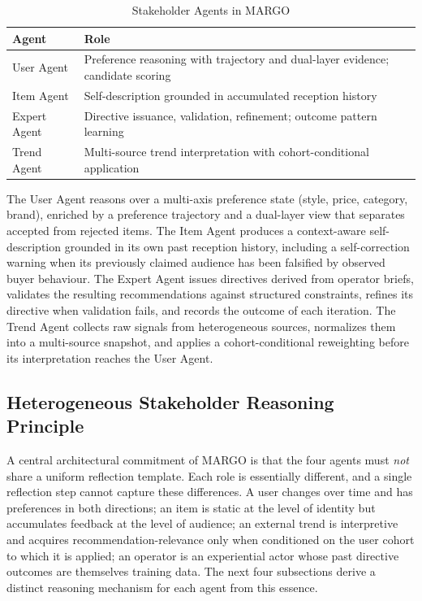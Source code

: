 \documentclass[master,english,final]{postech-ucs}
\begin{document}
\begin{table}[ht]
    \centering
    \caption{Stakeholder Agents in MARGO}
    \begin{tabular}{ll}
        \toprule
        \textbf{Agent} & \textbf{Role} \\
        \midrule
        User Agent & Preference reasoning with trajectory and dual-layer evidence; candidate scoring \\
        Item Agent & Self-description grounded in accumulated reception history \\
        Expert Agent & Directive issuance, validation, refinement; outcome pattern learning \\
        Trend Agent & Multi-source trend interpretation with cohort-conditional application \\
        \bottomrule
    \end{tabular}
    \label{tab:agent-roles}
\end{table}

The User Agent reasons over a multi-axis preference state (style, price, category, brand), enriched by a preference trajectory and a dual-layer view that separates accepted from rejected items.
The Item Agent produces a context-aware self-description grounded in its own past reception history, including a self-correction warning when its previously claimed audience has been falsified by observed buyer behaviour.
The Expert Agent issues directives derived from operator briefs, validates the resulting recommendations against structured constraints, refines its directive when validation fails, and records the outcome of each iteration.
The Trend Agent collects raw signals from heterogeneous sources, normalizes them into a multi-source snapshot, and applies a cohort-conditional reweighting before its interpretation reaches the User Agent.

\subsection{Heterogeneous Stakeholder Reasoning Principle}

A central architectural commitment of MARGO is that the four agents must \emph{not} share a uniform reflection template.
Each role is essentially different, and a single reflection step cannot capture these differences.
A user changes over time and has preferences in both directions; an item is static at the level of identity but accumulates feedback at the level of audience; an external trend is interpretive and acquires recommendation-relevance only when conditioned on the user cohort to which it is applied; an operator is an experiential actor whose past directive outcomes are themselves training data.
The next four subsections derive a distinct reasoning mechanism for each agent from this essence.
\end{document}
